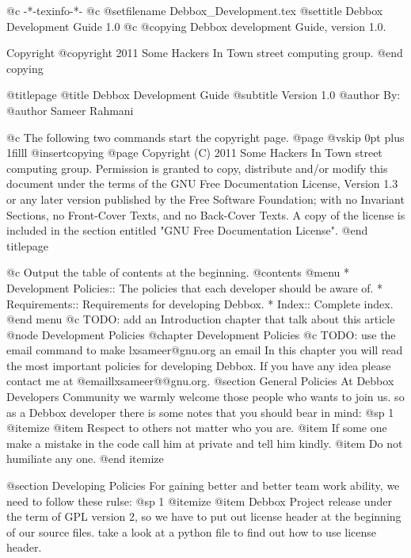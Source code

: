    @c -*-texinfo-*-
@c %
@setfilename Debbox_Development.tex
@settitle Debbox Development Guide 1.0
@c %
@copying
Debbox development Guide, version 1.0.

Copyright @copyright{} 2011 Some Hackers In Town street computing group.
@end copying

@titlepage
@title Debbox Development Guide
@subtitle Version 1.0
@author By:
@author Sameer Rahmani

@c The following two commands start the copyright page.
@page
@vskip 0pt plus 1filll
@insertcopying
@page
Copyright (C)  2011  Some Hackers In Town street computing group.
Permission is granted to copy, distribute and/or modify this document
under the terms of the GNU Free Documentation License, Version 1.3
or any later version published by the Free Software Foundation;
with no Invariant Sections, no Front-Cover Texts, and no Back-Cover Texts.
A copy of the license is included in the section entitled "GNU
Free Documentation License".
@end titlepage

@c Output the table of contents at the beginning.
@contents
@menu
* Development Policies::        The policies that each developer should be aware of.
* Requirements::        Requirements for developing Debbox.
* Index::            Complete index.
@end menu
@c TODO: add an Introduction chapter that talk about this article
@node Development Policies
@chapter Development Policies
@c TODO: use the email command to make lxsameer@gnu.org an email
In this chapter you will read the most important policies for developing Debbox. If you have any idea please contact me at @email{lxsameer@@gnu.org}.
@section General Policies    
At Debbox Developers Community we warmly welcome those people who wants to join us. so
as a Debbox developer there is some notes that you should bear in mind:
@sp 1
@itemize
@item
Respect to others not matter who you are.
@item
If some one make a mistake in the code call him at private and tell him kindly.
@item
Do not humiliate any one.
@end itemize

@section Developing Policies
For gaining better and better team work ability, we need to follow these rulse:
@sp 1
@itemize
@item
Debbox Project release under the term of GPL version 2, so we have to put out license
header at the beginning of our source files. take a look at a python file to find out how to use 
license header.

